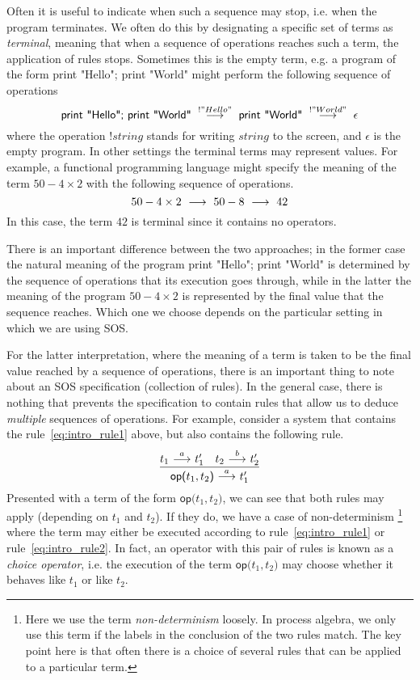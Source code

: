 Often it is useful to indicate when such a sequence may stop, i.e. when the
program terminates. We often do this by designating a specific set of terms as
\emph{terminal}, meaning that when a sequence of operations reaches such a term,
the application of rules stops.
Sometimes this is the empty term, e.g. a program of the form
\textsf{print "Hello"; print "World"} might perform the following sequence of
operations
\[
    \textsf{print "Hello"; print "World"}
    \;\ {\stackrel{{!"Hello"}}{\longrightarrow}}\ \;
    \textsf{print "World"}
    \;\ {\stackrel{{!"World"}}{\longrightarrow}}\ \;
    \epsilon
\]
where the operation $!string$ stands for writing $string$ to the screen, and
$\epsilon$ is the empty program. In other settings the terminal terms may represent
values. For example, a functional programming language might specify the meaning
of the term $50 - 4 \times 2$ with the following sequence of operations.
\[
    50 - 4 \times 2 \;\ {\stackrel{{}}{\longrightarrow}}\ \; 50 - 8 \;\ {\stackrel{{}}{\longrightarrow}}\ \; 42
\]
In this case, the term $42$ is terminal since it contains no operators.

There is an important difference between the two approaches; in the former case the natural meaning
of the program \textsf{print "Hello"; print "World"} is determined by the sequence
of operations that its execution goes through, while in the latter the meaning
of the program $50 - 4 \times 2$ is represented by the final value
that the sequence reaches. Which one we choose depends on the particular setting
in which we are using SOS.

For the latter interpretation, where the meaning of a term is taken to be the
final value reached by a sequence of operations, there is an important thing to
note about an SOS specification (collection of rules). In the general case, there
is nothing that prevents the specification to contain rules that allow us to
deduce \emph{multiple} sequences of operations. For example, consider a system
that contains the rule~\ref{eq:intro_rule1} above, but also contains the following
rule.
\begin{equation}\label{eq:intro_rule2}
    \frac{t_1 \ {\stackrel{{a}}{\longrightarrow}}\  t_1' \quad t_2 \ {\stackrel{{b}}{\longrightarrow}}\  t_2'}{\textsf{op(}t_1,t_2\textsf{)}\ {\stackrel{{a}}{\longrightarrow}}\  t_1'}
\end{equation}
Presented with a term of the form $\textsf{op(}t_1,t_2\textsf{)}$, we can see
that both rules may apply (depending on $t_1$ and $t_2$). If they do, we have
a case of non-determinism%
\footnote{Here we use the term {\em non-determinism} loosely. In process algebra, 
we only use this term if the labels in the conclusion of the two rules match. 
The key point here is that
often there is a choice of several rules that can be applied to a particular term.}
where the term may either be executed according to
rule~\ref{eq:intro_rule1} or rule~\ref{eq:intro_rule2}.
In fact, an operator
with this pair of rules is known as a \emph{choice operator}, i.e. the execution
of the term $\textsf{op(}t_1,t_2\textsf{)}$ may choose whether it behaves like
$t_1$ or like $t_2$.

